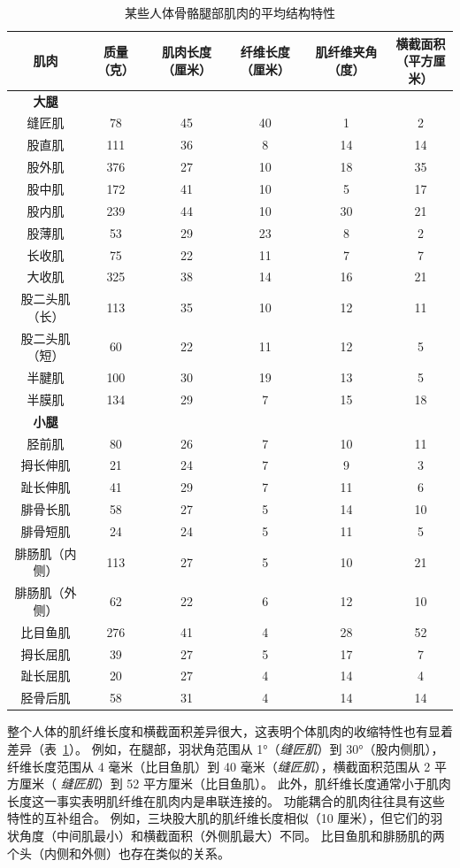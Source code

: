 \begin{table}[htbp]
	\caption{某些人体骨骼腿部肌肉的平均结构特性\label{tab:31_2}}
	\centering
	\begin{tabular}{cccccc}
		\toprule
		肌肉 & 质量（克） & 肌肉长度（厘米） & 纤维长度（厘米） & 肌纤维夹角（度） & \makecell[l]{横截面积\\（平方厘米）} \\
		\midrule
		\textbf{大腿} &   &  & & & \\
		缝匠肌 & 78 & 45 & 40 & 1 & 2 \\
		股直肌 & 111 & 36 & 8 & 14 & 14 \\
		股外肌 & 376 & 27 & 10 & 18 & 35 \\
		股中肌 & 172 & 41 & 10 & 5 & 17 \\
		股内肌 & 239 & 44 & 10 & 30 & 21 \\
		股薄肌 & 53 & 29 & 23 & 8 & 2 \\
		长收肌 & 75 & 22 & 11 & 7 & 7 \\
		大收肌 & 325 & 38 & 14 & 16 & 21 \\
		股二头肌（长） & 113 & 35 & 10 & 12 & 11 \\
		股二头肌（短） & 60 & 22 & 11 & 12 & 5 \\
		半腱肌 & 100 & 30 & 19 & 13 & 5 \\
		半膜肌 & 134 & 29 & 7 & 15 & 18 \\
		\textbf{小腿} &   &  & & & \\
		胫前肌 & 80 & 26 & 7 & 10 & 11 \\
		拇长伸肌 & 21 & 24 & 7 & 9 & 3 \\
		趾长伸肌 & 41 & 29 & 7 & 11 & 6 \\
		腓骨长肌 & 58 & 27 & 5 & 14 & 10 \\
		腓骨短肌 & 24 & 24 & 5 & 11 & 5 \\
		腓肠肌（内侧） & 113 & 27 & 5 & 10 & 21 \\
		腓肠肌（外侧） & 62 & 22 & 6 & 12 & 10 \\
		比目鱼肌 & 276 & 41 & 4 & 28 & 52 \\
		拇长屈肌 & 39 & 27 & 5 & 17 & 7 \\
		趾长屈肌 & 20 & 27 & 4 & 14 & 4 \\
		胫骨后肌 & 58 & 31 & 4 & 14 & 14 \\
		\bottomrule
	\end{tabular}
\end{table}


整个人体的肌纤维长度和横截面积差异很大，这表明个体肌肉的收缩特性也有显着差异（表~\ref{tab:31_2}）。
例如，在腿部，羽状角范围从 1°（\textit{缝匠肌}）到 30°（股内侧肌），纤维长度范围从 4 毫米（比目鱼肌）到 40 毫米（\textit{缝匠肌}），横截面积范围从 2 平方厘米（ \textit{缝匠肌}）到 52 平方厘米（比目鱼肌）。
此外，肌纤维长度通常小于肌肉长度这一事实表明肌纤维在肌肉内是串联连接的。
功能耦合的肌肉往往具有这些特性的互补组合。
例如，三块股大肌的肌纤维长度相似（10 厘米），但它们的羽状角度（中间肌最小）和横截面积（外侧肌最大）不同。
比目鱼肌和腓肠肌的两个头（内侧和外侧）也存在类似的关系。


